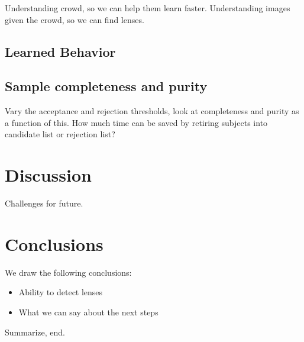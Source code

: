 \documentclass[useAMS,usenatbib,a4paper]{mn2e}
\begin{document}
Understanding crowd, so we can help them learn faster. Understanding
images given the crowd, so we can find lenses.


\subsection{Learned Behavior}
\label{sec:results:learning}


\subsection{Sample completeness and purity}
\label{sec:results:learning}

Vary the acceptance and rejection thresholds, look at completeness and
purity as a function of this. How much time can be saved by retiring
subjects into candidate list or rejection list?



\section{Discussion}
\label{sec:discuss}

Challenges for future.


\section{Conclusions}
\label{sec:conclude}

We draw the following conclusions:

\begin{itemize} 

\item Ability to detect lenses

\item What we can say about the next steps

\end{itemize}

Summarize, end.

\end{document}
